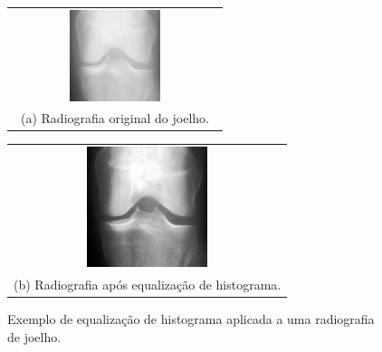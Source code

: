 \begin{figure}
    \centering
    \begin{tabular}{@{}c@{}}
        \includegraphics[width=0.45\textwidth]{figs/imagem-nao-equalizada.png} \\[\abovecaptionskip]
        \small (a) Radiografia original do joelho.
    \end{tabular}
    \hfill
    \begin{tabular}{@{}c@{}}
        \includegraphics[width=0.45\textwidth]{figs/image-equalizada.png} \\[\abovecaptionskip]
        \small (b) Radiografia após equalização de histograma.
    \end{tabular}
    \caption{Exemplo de equalização de histograma aplicada a uma radiografia de joelho.}
    \label{fig:histogram-equalization}
\end{figure}

